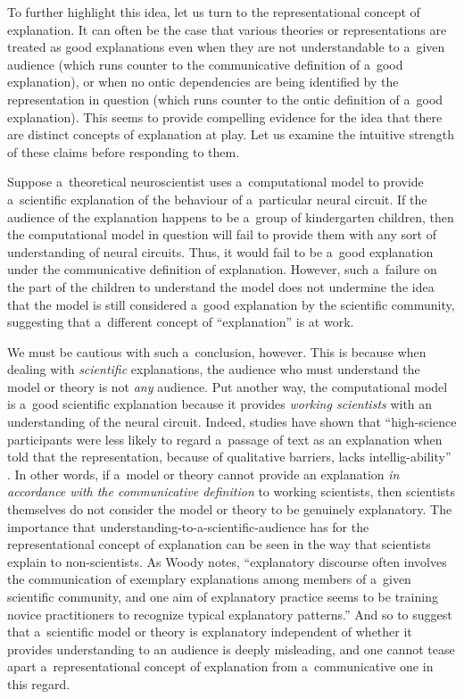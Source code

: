 To further highlight this idea, let us turn to the representational concept of explanation. It can often be the case that various theories or representations are treated as good explanations even when they are not understandable to a~given audience (which runs counter to the communicative definition of a~good explanation), or when no ontic dependencies are being identified by the representation in question (which runs counter to the ontic definition of a~good explanation). This seems to provide compelling evidence for the idea that there are distinct concepts of explanation at play. Let us examine the intuitive strength of these claims before responding to them.

Suppose a~theoretical neuroscientist uses a~computational model to provide a~scientific explanation of the behaviour of a~particular neural circuit. If the audience of the explanation happens to be a~group of kindergarten children, then the computational model in question will fail to provide them with any sort of understanding of neural circuits. Thus, it would fail to be a~good explanation under the communicative definition of explanation. However, such a~failure on the part of the children to understand the model does not undermine the idea that the model is still considered a~good explanation by the scientific community, suggesting that a~different concept of ``explanation'' is at work.

We must be cautious with such a~conclusion, however. This is because when dealing with \textit{scientific} explanations, the audience who must understand the model or theory is not \textit{any} audience. Put another way, the computational model is a~good scientific explanation because it provides \textit{working scientists} with an understanding of the neural circuit. Indeed, studies have shown that ``high-science participants were less likely to regard a~passage of text as an explanation when told that the representation, because of qualitative barriers, lacks intellig-ability''
\parencite[][p.1372]{braverman_intelligibility_2012}. %
 In other words, if a~model or theory cannot provide an explanation \textit{in accordance with the communicative definition} to working scientists, then scientists themselves do not consider the model or theory to be genuinely explanatory. The importance that understanding-to-a-scientific-audience has for the representational concept of explanation can be seen in the way that scientists explain to non-scientists. As Woody 
\parencite*[][p.81]{woody_re-orienting_2015} %
 notes, ``explanatory discourse often involves the communication of exemplary explanations among members of a~given scientific community, and one aim of explanatory practice seems to be training novice practitioners to recognize typical explanatory patterns.'' And so to suggest that a~scientific model or theory is explanatory independent of whether it provides understanding to an audience is deeply misleading, and one cannot tease apart a~representational concept of explanation from a~communicative one in this regard.

